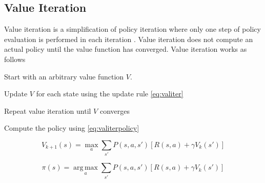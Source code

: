 \subsection{Value Iteration }
\label{sec:valueiteration}

Value iteration is a simplification of policy iteration where only one step of policy evaluation is performed in each iteration \parencite{barto1998reinforcement}. Value iteration does not compute an actual policy until the value function has converged. Value iteration works as follows

\begin{description}
\item[Initialization]
    Start with an arbitrary value function $V$.
\item[Value iteration]
    Update $V$ for each state using the update rule \eqref{eq:valiter}
\item Repeat value iteration until $V$ converges
\item Compute the policy using \eqref{eq:valiterpolicy}
\end{description}

\begin{equation} \label{eq:valiter}
V_{k+1}(s) = \operatorname*{max}_a \sum_{s'}{P(s, a, s') \left[R(s, a) + \gamma V_k(s')\right]}
\end{equation}

\begin{equation} \label{eq:valiterpolicy}
\pi(s) = \operatorname*{arg\,max}_a \sum_{s'}{P(s, a, s') \left[R(s, a) + \gamma V_k(s')\right]}
\end{equation}

